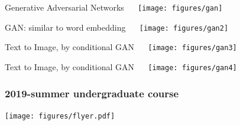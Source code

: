 \documentclass{beamer}
\begin{document}
\begin{CJK*}{UTF8}{gbsn}
\begin{frame}{Generative Adversarial Networks}
\centering  
\texttt{[image: figures/gan]}
\end{frame}


\begin{frame}{GAN: similar to word embedding 
}
\centering  
\texttt{[image: figures/gan2]}
\end{frame}


\begin{frame}{Text to Image, by conditional GAN}
\centering  
\texttt{[image: figures/gan3]}
\end{frame}



\begin{frame}{Text to Image, by conditional GAN}
\centering  
\texttt{[image: figures/gan4]}
\end{frame}










\begin{frame}
\frametitle{2019-summer undergraduate course}
\begin{center}
\texttt{[image: figures/flyer.pdf]}
\end{center}
\end{frame}





\end{CJK*}
\end{document}
